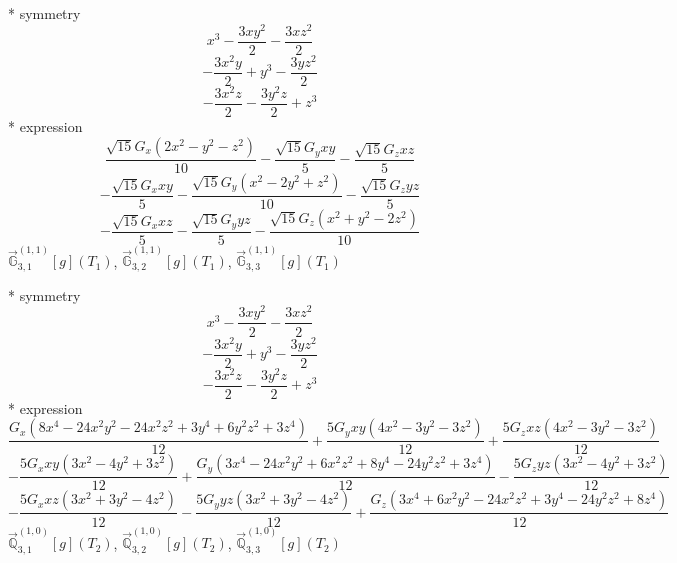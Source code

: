 \documentclass[fleqn,8pt]{jsarticle}
\begin{document}
\noindent\quad ** symmetry
\begin{dmath*}
x^{3} - \frac{3 x y^{2}}{2} - \frac{3 x z^{2}}{2}
\end{dmath*}
\begin{dmath*}
- \frac{3 x^{2} y}{2} + y^{3} - \frac{3 y z^{2}}{2}
\end{dmath*}
\begin{dmath*}
- \frac{3 x^{2} z}{2} - \frac{3 y^{2} z}{2} + z^{3}
\end{dmath*}
\noindent\quad ** expression
\begin{dmath*}
\frac{\sqrt{15} G_{x} \left(2 x^{2} - y^{2} - z^{2}\right)}{10} - \frac{\sqrt{15} G_{y} x y}{5} - \frac{\sqrt{15} G_{z} x z}{5}
\end{dmath*}
\begin{dmath*}
- \frac{\sqrt{15} G_{x} x y}{5} - \frac{\sqrt{15} G_{y} \left(x^{2} - 2 y^{2} + z^{2}\right)}{10} - \frac{\sqrt{15} G_{z} y z}{5}
\end{dmath*}
\begin{dmath*}
- \frac{\sqrt{15} G_{x} x z}{5} - \frac{\sqrt{15} G_{y} y z}{5} - \frac{\sqrt{15} G_{z} \left(x^{2} + y^{2} - 2 z^{2}\right)}{10}
\end{dmath*}
\noindent\quad $\vec{\mathbb{G}}_{3,1}^{(1,1)}[g](T_{1})$, $\vec{\mathbb{G}}_{3,2}^{(1,1)}[g](T_{1})$, $\vec{\mathbb{G}}_{3,3}^{(1,1)}[g](T_{1})$

\noindent\quad ** symmetry
\begin{dmath*}
x^{3} - \frac{3 x y^{2}}{2} - \frac{3 x z^{2}}{2}
\end{dmath*}
\begin{dmath*}
- \frac{3 x^{2} y}{2} + y^{3} - \frac{3 y z^{2}}{2}
\end{dmath*}
\begin{dmath*}
- \frac{3 x^{2} z}{2} - \frac{3 y^{2} z}{2} + z^{3}
\end{dmath*}
\noindent\quad ** expression
\begin{dmath*}
\frac{G_{x} \left(8 x^{4} - 24 x^{2} y^{2} - 24 x^{2} z^{2} + 3 y^{4} + 6 y^{2} z^{2} + 3 z^{4}\right)}{12} + \frac{5 G_{y} x y \left(4 x^{2} - 3 y^{2} - 3 z^{2}\right)}{12} + \frac{5 G_{z} x z \left(4 x^{2} - 3 y^{2} - 3 z^{2}\right)}{12}
\end{dmath*}
\begin{dmath*}
- \frac{5 G_{x} x y \left(3 x^{2} - 4 y^{2} + 3 z^{2}\right)}{12} + \frac{G_{y} \left(3 x^{4} - 24 x^{2} y^{2} + 6 x^{2} z^{2} + 8 y^{4} - 24 y^{2} z^{2} + 3 z^{4}\right)}{12} - \frac{5 G_{z} y z \left(3 x^{2} - 4 y^{2} + 3 z^{2}\right)}{12}
\end{dmath*}
\begin{dmath*}
- \frac{5 G_{x} x z \left(3 x^{2} + 3 y^{2} - 4 z^{2}\right)}{12} - \frac{5 G_{y} y z \left(3 x^{2} + 3 y^{2} - 4 z^{2}\right)}{12} + \frac{G_{z} \left(3 x^{4} + 6 x^{2} y^{2} - 24 x^{2} z^{2} + 3 y^{4} - 24 y^{2} z^{2} + 8 z^{4}\right)}{12}
\end{dmath*}
\noindent\quad $\vec{\mathbb{Q}}_{3,1}^{(1,0)}[g](T_{2})$, $\vec{\mathbb{Q}}_{3,2}^{(1,0)}[g](T_{2})$, $\vec{\mathbb{Q}}_{3,3}^{(1,0)}[g](T_{2})$
\end{document}
